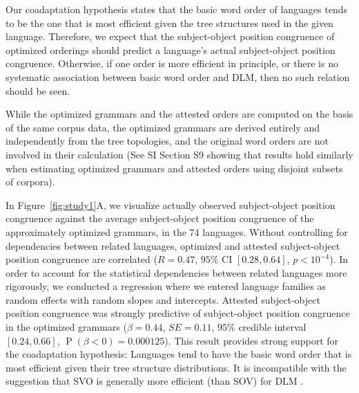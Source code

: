 \documentclass[11pt,a4paper]{article}
\newcommand\comment[1]{{\color{red}#1}}
\begin{document}

Our coadaptation hypothesis states that the basic word order of languages tends to be the one that is most efficient given the tree structures used in the given language.
Therefore, we expect that the subject-object position congruence of optimized orderings should predict a language's actual subject-object position congruence.
Otherwise, if one order is more efficient in principle, or there is no systematic association between basic word order and DLM, then no such relation should be seen.


While the optimized grammars and the attested orders are computed on the basis of the same corpus data, the optimized grammars are derived entirely and independently from the tree topologies, and the original word orders are not involved in their calculation (See SI Section S9 showing that results hold similarly when estimating optimized grammars and attested orders using disjoint subsets of corpora).



In Figure~\ref{fig:study1}A, we visualize actually observed subject-object position congruence against the average subject-object position congruence of the approximately optimized grammars, in the 74 languages.
Without controlling for dependencies between related languages, optimized and attested subject-object position congruence are correlated ($R=0.47$, $95\%$ CI $[0.28, 0.64]$, $p<10^{-4}$). %
In order to account for the statistical dependencies between related languages more rigorously, we conducted a regression where we entered language families as random effects with random slopes and intercepts.
Attested subject-object position congruence was strongly predictive of subject-object position congruence in the optimized grammars ($\beta = 0.44$, $SE=0.11$, $95\%$ credible interval $[0.24, 0.66]$, $\operatorname{P}(\beta<0) = 0.000125$). %
This result provides strong support for the coadaptation hypothesis: Languages tend to have the basic word order that is most efficient given their tree structure distributions.
It is incompatible with the suggestion that SVO is generally more efficient (than SOV) for DLM \citep{ferrer-i-cancho-placement-2017}.
\end{document}
